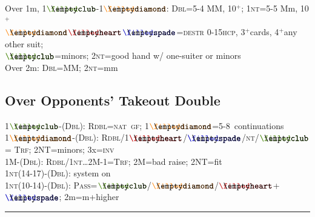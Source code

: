 \documentclass{article}
\newcommand\coloredsuitsymbol[3]{\ensuremath{\mathrel{\raisebox{-0.3pt}{{\color{#1}#2}\llap{#3}}}}}
\newcommand\suitsymbol[3]{\coloredsuitsymbol{#1}{#2}{#3}}%
\newcommand\C{\suitsymbol{clubcolor}{\filledclub}{\emptyclub}}
\newcommand\D{\suitsymbol{diamondcolor}{\filleddiamond}{\emptydiamond}}
\renewcommand\H{\suitsymbol{heartcolor}{\filledheart}{\emptyheart}}
\renewcommand\S{\suitsymbol{spadecolor}{\filledspade}{\emptyspade}}
\newcommand\N{\caps{nt}}
\newcommand\PASS{\caps{Pass}}
\newcommand\X{\caps{Dbl}}
\newcommand\XX{\caps{Rdbl}}
\newcommand\caps[1]{{\scshape#1}}
\newcommand\hcp{\caps{hcp}}
\newcommand\GF{\caps{gf}}
\newcommand\INV{\caps{inv}}
\newcommand\NAT{\caps{nat}}
\newcommand\more{\ensuremath{^+}}
\newcommand{\smallsection}[1]{\vspace{-1ex}\subsection*{#1}\raggedright}
\newcommand{\thinrule}{\rule{\textwidth}{\arrayrulewidth}}
\newcommand{\myendrule}{\vspace{-1.5ex}\thinrule}
\begin{document}
\begin{minipage}[t]{90mm}
	Over 1m, 1\C-1\D: \X=5-4 MM, 10\more; 1\N=5-5 Mm, 10\more\\
	\D\H\S=\caps{destr} 0-15\hcp, 3\more cards, 4\more any other suit;\\
	\C=minors; 2\N=good hand w/ one-suiter or minors\\
	Over 2m: \X=MM; 2\N=mm
\smallsection{Over Opponents' Takeout Double}
	1\C-(\X): \XX=\NAT\ \GF; 1\D=5-8\rightarrow\NAT\ continuations\\
	1\D-(\X): \XX/1\H/\S/\N/\C = \caps{Trf}; 2NT=minors; 3x=\INV \\
	1M-(\X): \XX/1\N\ldots2M-1=\caps{Trf}; 2M=bad raise; 2NT=fit\\
	1\N(14-17)-(\X): system on\\
	1\N(10-14)-(\X): \PASS=\C/\D/\H+\S; 2m=m+higher\\
\myendrule
\end{minipage}
\hfill
\end{document}
